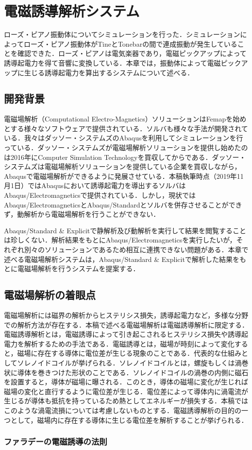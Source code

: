 \section{電磁誘導解析システム}

ローズ・ピアノ振動体についてシミュレーションを行った．シミュレーションによってローズ・ピアノ振動体がTineとTonebarの間で連成振動が発生していることを確認できた．ローズ・ピアノは電気楽器であり，電磁ピックアップによって誘導起電力を得て音響に変換している．本章では，振動体によって電磁ピックアップに生じる誘導起電力を算出するシステムについて述べる．

\subsection{開発背景}

電磁場解析（Computational Electro-Magnetics）ソリューションはFemapを始めとする様々なソフトウェアで提供されている．ソルバも様々な手法が開発されている．我々はダッソー・システムズのAbaqusを利用してシミュレーションを行っている．ダッソー・システムズが電磁場解析ソリューションを提供し始めたのは2016年にComputer Simulation Technologyを買収してからである．ダッソー・システムズは電磁場解析ソリューションを提供している企業を買収しながら，Abaqusで電磁場解析ができるように発展させている．本稿執筆時点（2019年11月1日）ではAbaqusにおいて誘導起電力を導出するソルバはAbaqus/Electromagneticsで提供されている．しかし，現状ではAbaqus/ElectromagneticsとAbaqus/Standardとソルバを併存させることができず，動解析から電磁場解析を行うことができない．

Abaqus/Standard & Explicitで静解析及び動解析を実行して結果を閲覧することは珍しくない．解析結果をもとにAbaqus/Electromagneticsを実行したいが，それぞれ別々のソリューションであるため相互に連携できない問題がある．本章で述べる電磁場解析システムは，Abaqus/Standard & Explicitで解析した結果をもとに電磁場解析を行うシステムを提案する．

\subsection{電磁場解析の着眼点}

電磁場解析には磁界の解析からヒステリシス損失，誘導起電力など，多様な分野での解析方法が存在する．本稿で述べる電磁場解析は電磁誘導解析に限定する．電磁誘導解析とは，電磁誘導によって引き起こされるヒステリシス損失や誘導起電力を解析するための手法である．電磁誘導とは，磁場が時刻によって変化すると，磁場に存在する導体に電位差が生じる現象のことである．代表的な仕組みとしてソレノイドコイルが挙げられる．ソレノイドコイルとは，螺旋もしくは渦巻状に導体を巻きつけた形状のことである．ソレノイドコイルの渦巻の内側に磁石を設置すると，導体が磁場に曝される．このとき，導体の磁場に変化が生じれば磁場の変化と直行するように電位差が生じる．電位差によって導体内に渦電流が生じるが導体も抵抗を持っているため熱としてエネルギーが損失する．本稿ではこのような渦電流損については考慮しないものとする．電磁誘導解析の目的の一つとして，磁場内に存在する導体に生じる電位差を解析することが挙げられる．


\subsubsection{ファラデーの電磁誘導の法則}
